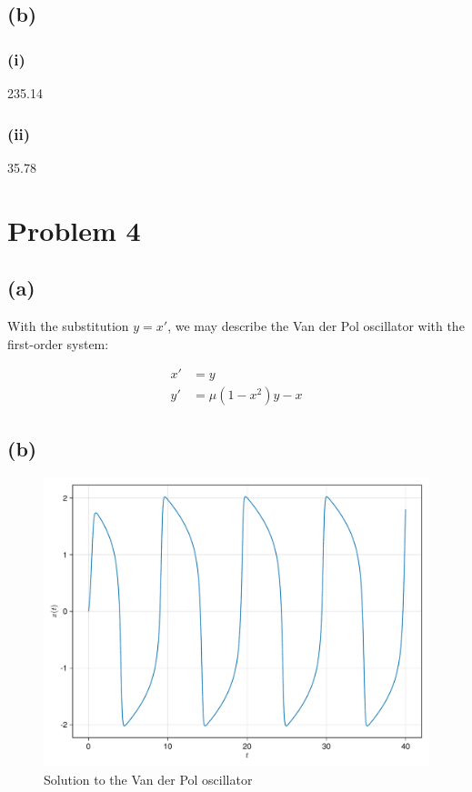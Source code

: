 \documentclass[a4paper, british]{article}
\begin{document}
\subsection*{(b)}

\subsubsection*{(i)}

235.14

\subsubsection*{(ii)}

35.78

\newpage

\section{Problem 4}

\subsection*{(a)}

With the substitution \(y = x \prime\), we may describe the Van der Pol oscillator with the first-order system:

\begin{align*}
    x \prime &= y \\
    y \prime &= \mu (1 - x^2)y - x
\end{align*}

\subsection*{(b)}

\begin{figure}[H]
    \centering
    \includegraphics[width=\textwidth]{figures/f4_1.pdf}
    \caption{Solution to the Van der Pol oscillator}
    \label{fig:4_1}
\end{figure}
\end{document}

